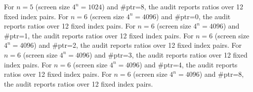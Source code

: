 \noindent\AuditTag For $n=5$ (screen size $4^n=1024$) and \#ptr=8, the audit reports ratios over 12 fixed index pairs.
\noindent\AuditTag For $n=6$ (screen size $4^n=4096$) and \#ptr=0, the audit reports ratios over 12 fixed index pairs.
\noindent\AuditTag For $n=6$ (screen size $4^n=4096$) and \#ptr=1, the audit reports ratios over 12 fixed index pairs.
\noindent\AuditTag For $n=6$ (screen size $4^n=4096$) and \#ptr=2, the audit reports ratios over 12 fixed index pairs.
\noindent\AuditTag For $n=6$ (screen size $4^n=4096$) and \#ptr=3, the audit reports ratios over 12 fixed index pairs.
\noindent\AuditTag For $n=6$ (screen size $4^n=4096$) and \#ptr=4, the audit reports ratios over 12 fixed index pairs.
\noindent\AuditTag For $n=6$ (screen size $4^n=4096$) and \#ptr=8, the audit reports ratios over 12 fixed index pairs.